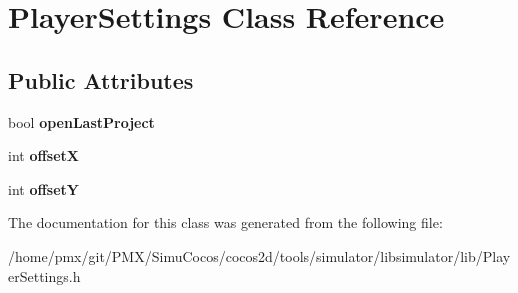 \hypertarget{classPlayerSettings}{}\section{Player\+Settings Class Reference}
\label{classPlayerSettings}
\subsection*{Public Attributes}
\begin{DoxyCompactItemize}
\item 
\mbox{\label{classPlayerSettings_a70bec9a003305c3897d2a088953c36c6}} 
bool {\bfseries open\+Last\+Project}
\item 
\mbox{\label{classPlayerSettings_ade92c333de75a62f590d52994c585654}} 
int {\bfseries offsetX}
\item 
\mbox{\label{classPlayerSettings_aa045c35d0a8659575336781831c67850}} 
int {\bfseries offsetY}
\end{DoxyCompactItemize}


The documentation for this class was generated from the following file\+:\begin{DoxyCompactItemize}
\item 
/home/pmx/git/\+P\+M\+X/\+Simu\+Cocos/cocos2d/tools/simulator/libsimulator/lib/Player\+Settings.\+h\end{DoxyCompactItemize}
